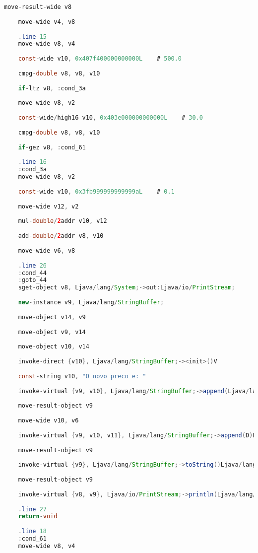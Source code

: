 \documentclass[hidelinks,12pt]{article}
\begin{document}
\begin{lstlisting}[caption=Smali resultante do .java,language=java]
	move-result-wide v8
	
	move-wide v4, v8
	
	.line 15
	move-wide v8, v4
	
	const-wide v10, 0x407f400000000000L    # 500.0
	
	cmpg-double v8, v8, v10
	
	if-ltz v8, :cond_3a
	
	move-wide v8, v2
	
	const-wide/high16 v10, 0x403e000000000000L    # 30.0
	
	cmpg-double v8, v8, v10
	
	if-gez v8, :cond_61
	
	.line 16
	:cond_3a
	move-wide v8, v2
	
	const-wide v10, 0x3fb999999999999aL    # 0.1
	
	move-wide v12, v2
	
	mul-double/2addr v10, v12
	
	add-double/2addr v8, v10
	
	move-wide v6, v8
	
	.line 26
	:cond_44
	:goto_44
	sget-object v8, Ljava/lang/System;->out:Ljava/io/PrintStream;
	
	new-instance v9, Ljava/lang/StringBuffer;
	
	move-object v14, v9
	
	move-object v9, v14
	
	move-object v10, v14
	
	invoke-direct {v10}, Ljava/lang/StringBuffer;-><init>()V
	
	const-string v10, "O novo preco e: "
	
	invoke-virtual {v9, v10}, Ljava/lang/StringBuffer;->append(Ljava/lang/String;)Ljava/lang/StringBuffer;
	
	move-result-object v9
	
	move-wide v10, v6
	
	invoke-virtual {v9, v10, v11}, Ljava/lang/StringBuffer;->append(D)Ljava/lang/StringBuffer;
	
	move-result-object v9
	
	invoke-virtual {v9}, Ljava/lang/StringBuffer;->toString()Ljava/lang/String;
	
	move-result-object v9
	
	invoke-virtual {v8, v9}, Ljava/io/PrintStream;->println(Ljava/lang/String;)V
	
	.line 27
	return-void
	
	.line 18
	:cond_61
	move-wide v8, v4
	

\end{lstlisting}
\end{document}
